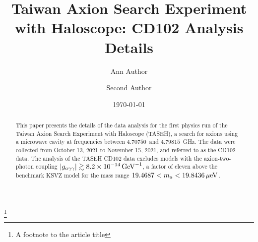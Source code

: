 \documentclass[%
preprint, %
 amsmath,amssymb,
 aps,
]{revtex4-2}
\newcommand{\gagg}{\ensuremath{\left|g_{a\gamma\gamma}\right|}}
\newcommand{\ma}{\ensuremath{m_a}}
\newcommand{\muevcc}{\ensuremath{\,\mu\text{e\hspace{-.08em}V}}}
\newcommand{\GeVinv}{\ensuremath{\,\text{Ge\hspace{-.08em}V}^{-1}}}
\newcommand{\flo}{\ensuremath{4.70750}}
\newcommand{\fhi}{\ensuremath{4.79815}}
\newcommand{\mlo}{\ensuremath{19.4687}}
\newcommand{\mhi}{\ensuremath{19.8436}}
\newcommand{\avelimit}{\ensuremath{8.2\times 10^{-14}}} %
\begin{document}

\title{Taiwan Axion Search Experiment with Haloscope: CD102 Analysis Details}%
\thanks{A footnote to the article title}%

\author{Ann Author}
\author{Second Author}%
%



\date{\today}%

\begin{abstract}

This paper presents the details of the data analysis for the first physics 
run of the Taiwan Axion Search Experiment with Haloscope (TASEH), 
a search for axions 
using a microwave cavity at frequencies between \flo\ and \fhi~GHz. 
The data were collected from October 13, 2021 to November 15, 2021, and 
referred to as the CD102 data. The analysis of the TASEH CD102 data excludes 
models with the axion-two-photon coupling 
$\gagg\gtrsim \avelimit\GeVinv$, a factor of eleven above the benchmark 
KSVZ model for the mass range $\mlo < \ma < \mhi \muevcc$. 


\end{abstract}
\end{document}
